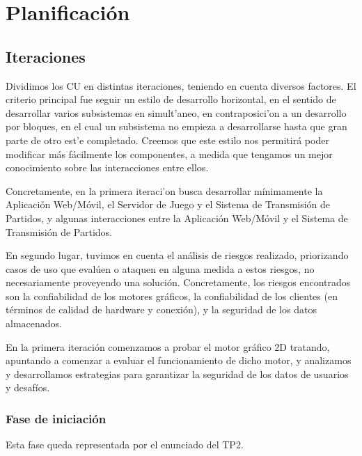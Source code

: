 \documentclass[a4paper, 10pt, twoside]{article}
\begin{document}
\newpage


\section{Planificación}

\subsection{Iteraciones}
Dividimos los CU en distintas iteraciones, teniendo en cuenta diversos factores. El criterio principal fue seguir un estilo de desarrollo horizontal, en el sentido de desarrollar varios subsistemas en simult'aneo, en contraposici'on a un desarrollo por bloques, en el cual un subsistema no empieza a desarrollarse hasta que gran parte de otro est'e completado. Creemos que este estilo nos permitirá poder modificar más fácilmente los componentes, a medida que tengamos un mejor conocimiento sobre las interacciones entre ellos.

Concretamente, en la primera iteraci'on busca desarrollar mínimamente la Aplicación Web/Móvil, el Servidor de Juego y el Sistema de Transmisión de Partidos, y algunas interacciones entre la Aplicación Web/Móvil y el Sistema de Transmisión de Partidos.

En segundo lugar, tuvimos en cuenta el análisis de riesgos realizado, priorizando casos de uso que evalúen o ataquen en alguna medida a estos riesgos, no necesariamente proveyendo una solución. Concretamente, los riesgos encontrados son la confiabilidad de los motores gráficos, la confiabilidad de los clientes (en términos de calidad de hardware y conexión), y la seguridad de los datos almacenados.

En la primera iteración comenzamos a probar el motor gráfico 2D tratando, apuntando a comenzar a evaluar el funcionamiento de dicho motor, y analizamos y desarrollamos estrategias para garantizar la seguridad de los datos de usuarios y desafíos.

\subsubsection{Fase de iniciación}
Esta fase queda representada por el enunciado del TP2.
\end{document}
